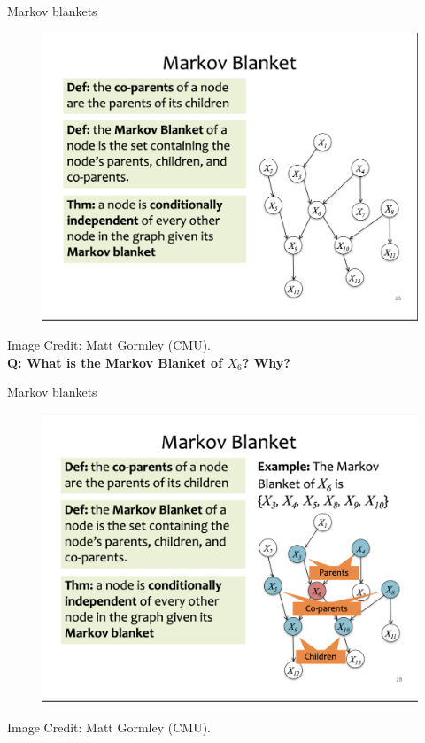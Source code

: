 \documentclass[10pt]{beamer}
\begin{document}
\begin{frame}{Markov blankets}
\begin{figure}[H]
\includegraphics[width=.8\textwidth]{images/markov_blanket_1}
\end{figure} 
\vfill
\tiny \hfill Image Credit: Matt Gormley (CMU).  \\
\pause 
\tiny \bf{Q}: What is the Markov Blanket of $X_6$?  Why?
 \end{frame}


\begin{frame}{Markov blankets}
\begin{figure}[H]
\includegraphics[width=.8\textwidth]{images/markov_blanket_2}
\end{figure} 
\vfill
\tiny \hfill Image Credit: Matt Gormley (CMU). 
 \end{frame}
\end{document}
